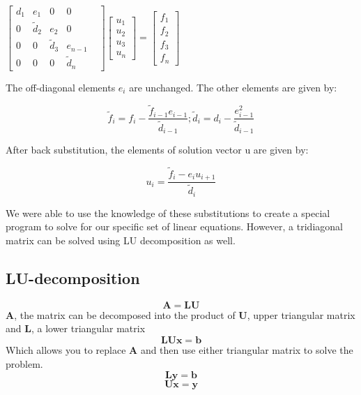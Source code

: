 \documentclass[10pt,showpacs,preprintnumbers,footinbib,amsmath,amssymb,aps,prl,twocolumn,groupedaddress,superscriptaddress,showkeys]{revtex4-1}
\begin{document}
\begin{center}
		$\begin{bmatrix}
			d_{1}& e_{1} & 0 & 0 \\
			0 & \tilde{d}_{2} & e_{2} & 0 & \\
			0 & 0 & \tilde{d}_{3} & e_{n-1}   \\
			0 & 0 & 0 & \tilde{d}_{n} 
	
		\end{bmatrix}
		 \begin{bmatrix}
			u_{1} \\
			u_{2} \\
			u_{3} \\
			u_{n} 
		\end{bmatrix} =
		\begin{bmatrix}
			f_{1} \\
			f_{2} \\
			f_{3} \\
			f_{n}
		\end{bmatrix}$
		\end{center}

The off-diagonal elements $e_{i}$ are unchanged. The other elements are given by:

	\begin{equation}
        \label{eq:f}
	\tilde{f}_{i}=f_{i}-\frac{\tilde{f}_{i-1}e_{i-1}}{\tilde{d}_{i-1}} ; \tilde{d}_{i}=d_{i}-\frac{e^{2}_{i-1}}{\tilde{d}_{i-1}}
	\end{equation}
	
After back substitution, the elements of solution vector u are given by:

	\begin{equation}
        \label{eq:g}
	u_{i} = \frac{\tilde{f}_{i}-e_{i}u_{i+1}}{\tilde{d}_{i}}
	\end{equation}

We were able to use the knowledge of these substitutions to create a special program to solve for our specific set of linear equations.  However, a tridiagonal matrix can be solved using LU decomposition as well.
	
	\subsection{LU-decomposition}
	
	\begin{equation} \mathbf{A=LU} \end{equation}
$\mathbf{A}$, the matrix can be decomposed into the product of  $\mathbf{U}$, upper triangular matrix and $\mathbf{L}$, a lower triangular matrix
	\begin{equation} \mathbf{LUx=b} \end{equation}
	Which allows you to replace $\mathbf{A}$ and then use either triangular matrix to solve the problem.
	\begin{equation}\label{eq:i} \mathbf{Ly=b} \end{equation}
	\begin{equation}\label{eq:j} \mathbf{Ux=y} \end{equation}
\end{document}
